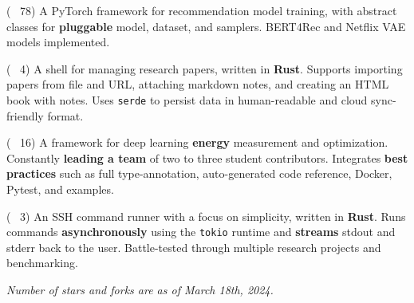 
\begin{cvlist}

  \cvlistitem
    {\href{https://github.com/jaywonchung/BERT4Rec-VAE-Pytorch}{} 
    {\normalfont( \faCodeFork~78)}} %
    {A PyTorch framework for recommendation model training, with abstract classes for \textbf{pluggable} model, dataset, and samplers. BERT4Rec and Netflix VAE models implemented.} %

  \cvlistitem
    {\href{https://github.com/jaywonchung/reason}{}
    {\normalfont( \faCodeFork~4)}} %
    {A shell for managing research papers, written in \textbf{Rust}. Supports importing papers from file and URL, attaching markdown notes, and creating an HTML book with notes. Uses \texttt{serde} to persist data in human-readable and cloud sync-friendly format.} %

  \cvlistitem
    {\href{https://github.com/SymbioticLab/Zeus}{}
    {\normalfont( \faCodeFork~16)}} %
    {A framework for deep learning \textbf{energy} measurement and optimization. Constantly \textbf{leading a team} of two to three student contributors. Integrates \textbf{best practices} such as full type-annotation, auto-generated code reference, Docker, Pytest, and examples.} %

  \cvlistitem
    {\href{https://github.com/jaywonchung/pegasus}{}
    {\normalfont( \faCodeFork~3)}} %
    {An SSH command runner with a focus on simplicity, written in \textbf{Rust}. Runs commands \textbf{asynchronously} using the \texttt{tokio} runtime and \textbf{streams} stdout and stderr back to the user. Battle-tested through multiple research projects and benchmarking.} %

\end{cvlist}

\vspace{-5mm}

\begin{cvparagraph}
\textit{Number of stars and forks are as of March 18th, 2024.}
\end{cvparagraph}
